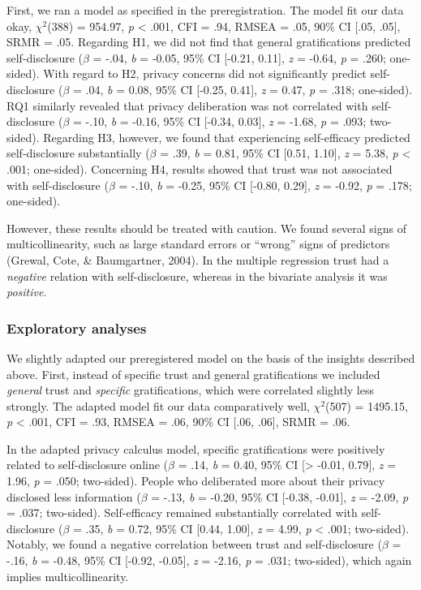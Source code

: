 \documentclass[
  english,
  man,floatsintext]{apa6}
\begin{document}
First, we ran a model as specified in the preregistration. The model fit our data okay, \(\chi^2\)(388) = 954.97, \emph{p} \textless{} .001, CFI = .94, RMSEA = .05, 90\% CI {[}.05, .05{]}, SRMR = .05.
Regarding H1, we did not find that general gratifications predicted self-disclosure (\(\beta\) = -.04, \textit{b} = -0.05, 95\% CI {[}-0.21, 0.11{]}, \textit{z} = -0.64, \textit{p} = .260; one-sided).
With regard to H2, privacy concerns did not significantly predict self-disclosure (\(\beta\) = .04, \textit{b} = 0.08, 95\% CI {[}-0.25, 0.41{]}, \textit{z} = 0.47, \textit{p} = .318; one-sided).
RQ1 similarly revealed that privacy deliberation was not correlated with self-disclosure (\(\beta\) = -.10, \textit{b} = -0.16, 95\% CI {[}-0.34, 0.03{]}, \textit{z} = -1.68, \textit{p} = .093; two-sided).
Regarding H3, however, we found that experiencing self-efficacy predicted self-disclosure substantially (\(\beta\) = .39, \textit{b} = 0.81, 95\% CI {[}0.51, 1.10{]}, \textit{z} = 5.38, \textit{p} \textless{} .001; one-sided).
Concerning H4, results showed that trust was not associated with self-disclosure (\(\beta\) = -.10, \textit{b} = -0.25, 95\% CI {[}-0.80, 0.29{]}, \textit{z} = -0.92, \textit{p} = .178; one-sided).

However, these results should be treated with caution.
We found several signs of multicollinearity, such as large standard errors or ``wrong'' signs of predictors (Grewal, Cote, \& Baumgartner, 2004).
In the multiple regression trust had a \emph{negative} relation with self-disclosure, whereas in the bivariate analysis it was \emph{positive}.

\hypertarget{exploratory-analyses}{%
\subsubsection{Exploratory analyses}\label{exploratory-analyses}}

We slightly adapted our preregistered model on the basis of the insights described above.
First, instead of specific trust and general gratifications we included \emph{general} trust and \emph{specific} gratifications, which were correlated slightly less strongly.
The adapted model fit our data comparatively well, \(\chi^2\)(507) = 1495.15, \emph{p} \textless{} .001, CFI = .93, RMSEA = .06, 90\% CI {[}.06, .06{]}, SRMR = .06.

In the adapted privacy calculus model, specific gratifications were positively related to self-disclosure online (\(\beta\) = .14, \textit{b} = 0.40, 95\% CI {[}\textgreater{} -0.01, 0.79{]}, \textit{z} = 1.96, \textit{p} = .050; two-sided).
People who deliberated more about their privacy disclosed less information (\(\beta\) = -.13, \textit{b} = -0.20, 95\% CI {[}-0.38, -0.01{]}, \textit{z} = -2.09, \textit{p} = .037; two-sided).
Self-efficacy remained substantially correlated with self-disclosure (\(\beta\) = .35, \textit{b} = 0.72, 95\% CI {[}0.44, 1.00{]}, \textit{z} = 4.99, \textit{p} \textless{} .001; two-sided).
Notably, we found a negative correlation between trust and self-disclosure (\(\beta\) = -.16, \textit{b} = -0.48, 95\% CI {[}-0.92, -0.05{]}, \textit{z} = -2.16, \textit{p} = .031; two-sided), which again implies multicollinearity.
\end{document}
